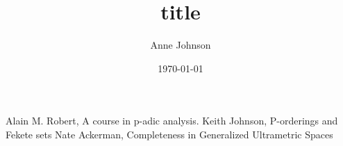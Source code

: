 \documentclass[11pt]{report}
\title{title}
\author{Anne Johnson}
\date{\today}
\theoremstyle{definition}
\begin{document}


%
%

%

%	
\begin{thebibliography}{1}
 Alain M. Robert, A course in p-adic analysis.
 Keith Johnson, P-orderings and Fekete sets
 Nate Ackerman,  Completeness in Generalized Ultrametric Spaces
\end{thebibliography}
\end{document}
